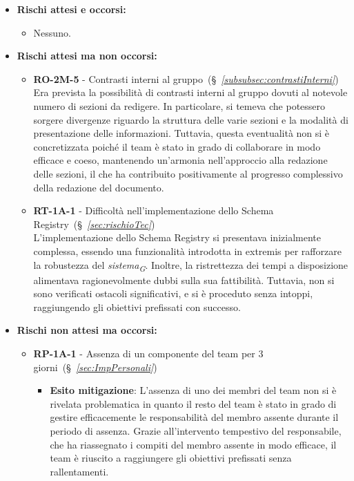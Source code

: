 \begin{itemize}
    \item \textbf{Rischi attesi e occorsi:}
        \begin{itemize}
            \item Nessuno.
        \end{itemize}
    \item \textbf{Rischi attesi ma non occorsi:}
        \begin{itemize}
            \item \textbf{RO-2M-5} - Contrasti interni al gruppo~(\S~\textit{\ref{subsubsec:contrastiInterni}}) \\
            Era prevista la possibilità di contrasti interni al gruppo dovuti al notevole numero di sezioni da redigere. In particolare, si temeva che potessero sorgere divergenze riguardo la struttura delle varie sezioni e la modalità di presentazione delle informazioni. Tuttavia, questa eventualità non si è concretizzata poiché il team è stato in grado di collaborare in modo efficace e coeso, mantenendo un'armonia nell'approccio alla redazione delle sezioni, il che ha contribuito positivamente al progresso complessivo della redazione del documento.
            \item \textbf{RT-1A-1} - Difficoltà nell’implementazione dello Schema Registry~(\S~\textit{\ref{sec:rischioTec}}) \\
            L'implementazione dello Schema Registry si presentava inizialmente complessa, essendo una funzionalità introdotta in extremis per rafforzare la robustezza del \textit{sistema}\textsubscript{\textit{G}}. Inoltre, la ristrettezza dei tempi a disposizione alimentava ragionevolmente dubbi sulla sua fattibilità. Tuttavia, non si sono verificati ostacoli significativi, e si è proceduto senza intoppi, raggiungendo gli obiettivi prefissati con successo.
        \end{itemize}
    \item \textbf{Rischi non attesi ma occorsi:}
        \begin{itemize}
            \item \textbf{RP-1A-1} - Assenza di un componente del team per 3 giorni~(\S~\textit{\ref{sec:ImpPersonali}})
                \begin{itemize}
                    \item \textbf{Esito mitigazione}: L'assenza di uno dei membri del team non si è rivelata problematica in quanto il resto del team è stato in grado di gestire efficacemente le responsabilità del membro assente durante il periodo di assenza. Grazie all'intervento tempestivo del responsabile, che ha riassegnato i compiti del membro assente in modo efficace, il team è riuscito a raggiungere gli obiettivi prefissati senza rallentamenti.

\end{itemize}
\end{itemize}
\end{itemize}
